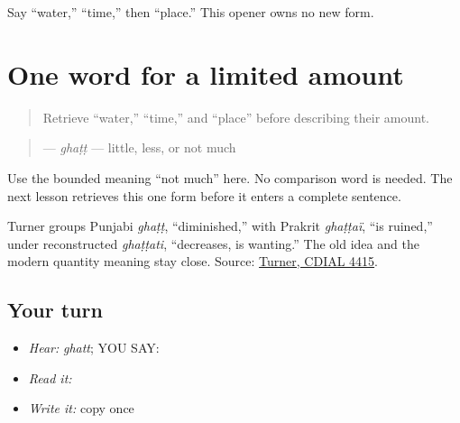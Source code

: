 \begin{tcolorbox}[breakable,colback=teal!4,colframe=teal!35!black,title={Before you move on}]
Say “water,” “time,” then “place.” This opener owns no new form.
\end{tcolorbox}
\section[\texorpdfstring{\pa{ਘੱਟ} (ghatt)}{ਘੱਟ (ghatt)}]{One word for a limited amount}

\label{lesson:PA-C191-ghatt}



\begin{quote}
Retrieve “water,” “time,” and “place” before describing their amount.
\end{quote}

\begin{grammarlens}[title={Grammar Lens: direct owner}]
\begin{quote}
\textbf{} — \emph{ghaṭṭ} — little, less, or not much
\end{quote}

Use the bounded meaning “not much” here. No comparison word is needed. The next lesson retrieves this one form before it enters a complete sentence.
\end{grammarlens}

\begin{tcolorbox}[breakable,skin=enhanced,colback=violet!6,colframe=violet!45!black,boxrule=0.5pt,arc=1mm,left=6pt,right=6pt,top=4pt,bottom=4pt,fonttitle=\bfseries,title={Across the family}]
Turner groups Punjabi \emph{ghaṭṭ}, “diminished,” with Prakrit \emph{ghaṭṭaï}, “is ruined,” under reconstructed \emph{ghaṭṭati}, “decreases, is wanting.” The old idea and the modern quantity meaning stay close. Source: \href{https://dsal.uchicago.edu/cgi-bin/app/soas\_query.py?qs=\%2Agha\%E1\%B9\%AD\%E1\%B9\%ADati\&searchhws=yes}{Turner, CDIAL 4415}.
\end{tcolorbox}

\subsection*{Your turn}
\begin{itemize}
\raggedright
  \item \emph{Hear:} \emph{ghatt}; YOU SAY: \textbf{}
  \item \emph{Read it:} \textbf{}
  \item \emph{Write it:} copy \textbf{} once
\end{itemize}

